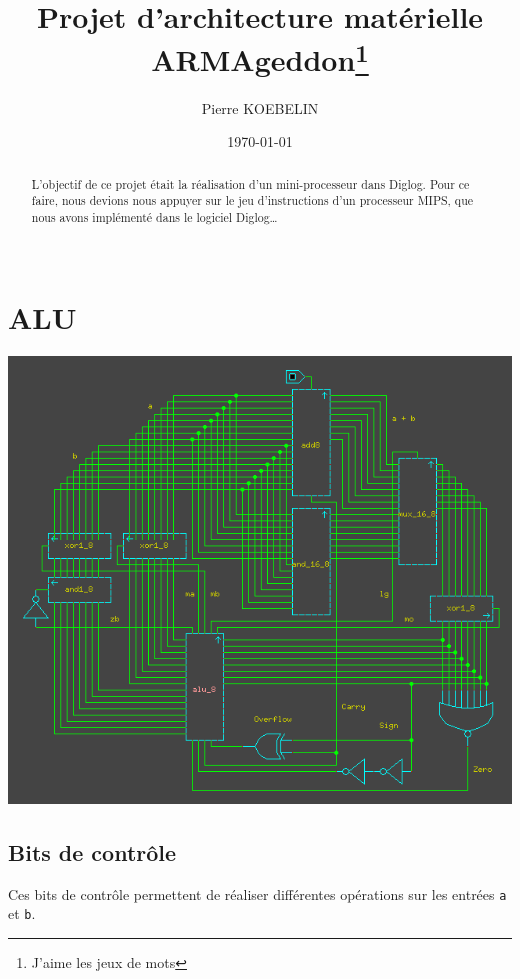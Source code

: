 \documentclass[11pt, a4paper, twoside, titlepage]{article}
\begin{document}
\title{{\titlefont Projet d'architecture matérielle}\\ARMAgeddon\thanks{J'aime les jeux de mots}}
\author{Pierre KOEBELIN}
\date{\today} 
\maketitle


\begin{abstract}

	L’objectif de ce projet était la réalisation d’un mini-processeur dans Diglog. Pour ce faire, nous devions nous appuyer sur le jeu d'instructions d'un processeur MIPS, que nous avons implémenté dans le logiciel Diglog\ldots\\
\\

\end{abstract}

\tableofcontents

\newpage
\section{ALU}

\begin{center}
	\includegraphics[width=0.8 \textwidth]{alu_8}
\end{center}

\subsection{Bits de contrôle}
Ces bits de contrôle permettent de réaliser différentes opérations sur les entrées \texttt{a} et \texttt{b}.
\end{document}
